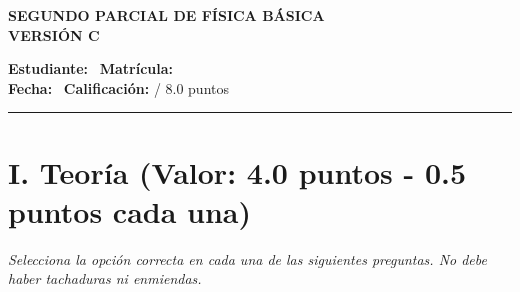 \documentclass[11pt,a4paper]{article}
\begin{document}
\begin{center}
    \textbf{\Large SEGUNDO PARCIAL DE FÍSICA BÁSICA} \\[0.2cm]
    \textbf{\large VERSIÓN C} \\[0.4cm]
\end{center}

\noindent \textbf{Estudiante:} \hrulefill \ \textbf{Matrícula:} \underline{\hspace{3cm}} \\[0.2cm]
\textbf{Fecha:} \underline{\hspace{4cm}} \ \textbf{Calificación:} \underline{\hspace{1.5cm}} / 8.0 puntos \\

\hrule
\section*{I. Teoría (Valor: 4.0 puntos - 0.5 puntos cada una)}
\textit{Selecciona la opción correcta en cada una de las siguientes preguntas. No debe haber tachaduras ni enmiendas.}
\end{document}
